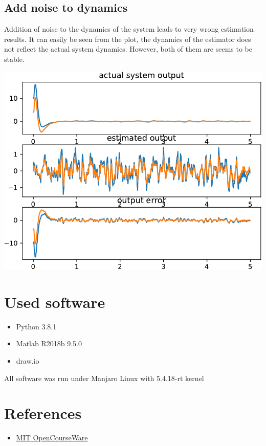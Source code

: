 \documentclass[a4paper,12pt]{article}
\begin{document}
\subsection{Add noise to dynamics}
Addition of noise to the dynamics of the system leads to very wrong estimation results.
It can easily be seen from the plot, the dynamics of the estimator does not reflect
the actual system dynamics. However, both of them are seems to be stable.
\begin{center}
    \includegraphics[width=\linewidth]{../Task2/est_cont_more_noise_out.pdf}
\end{center}

\section{Used software}
\begin{itemize}
    \item Python 3.8.1
    \item Matlab R2018b 9.5.0
    \item draw.io
\end{itemize}
All software was run under Manjaro Linux with 5.4.18-rt kernel
\section{References}
\begin{itemize}
    \item \href{https://ocw.mit.edu/courses/aeronautics-and-astronautics/16-30-feedback-control-systems-fall-2010/lecture-notes/MIT16_30F10_lec14.pdf}
    {MIT OpenCourseWare}
\end{itemize}
\end{document}
